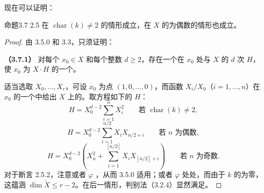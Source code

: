 现在可以证明：
\begin{SGAresult}{命题}{3.7}
 2.5 在 $\operatorname{char}(k)\ne2$ 的情形成立，在 $X$ 的为偶数的情形也成立。
\end{SGAresult}
\begin{proof}
由 3.5.0 和 3.3，只须证明：

\textbf{（3.7.1）} 对每个 $x_0\in X$ 和每个整数 $d\geq2$，存在一个在 $x_0$ 处与 $X$ 的 $d$ 次 $H$，使 $x_0$ 为 $X\cdot H$ 的一个。

适当选取 $X_0,\ldots,X_r$，可设 $x_0$ 为点 $(1,0,\ldots,0)$，而函数 $X_i/X_0$（$i=1,\ldots,n$）在 $x_0$ 的一个中给出 $X$ 上的。取方程如下的 $H$：
\[
H=X_0^{d-2}\sum_{i=1}^{n}X_i^2\qquad\text{若 }\operatorname{char}(k)\ne2,
\tag{3.7.1.1}
\]
\[
H=X_0^{d-2}\sum_{i=1}^{n/2}X_iX_{n/2+i}\qquad\text{若 }n\text{ 为偶数},
\tag{3.7.1.2}
\]
\[
H=X_0^{d-2}\left(X_n^2+\sum_{i=1}^{[n/2]}X_iX_{[n/2]+i}\right)\qquad\text{若 }n\text{ 为奇数}.
\tag{3.7.1.3}
\]
对于断言 2.5.2，注意或者 $\varphi$ ，从而 3.5.0 适用；或者 $\varphi$ 处处，而由于 $k$ 的为零，这蕴涵 $\dim\check X\leq r-2$。在后一情形，判别法（3.2.4）显然满足。
\end{proof}
